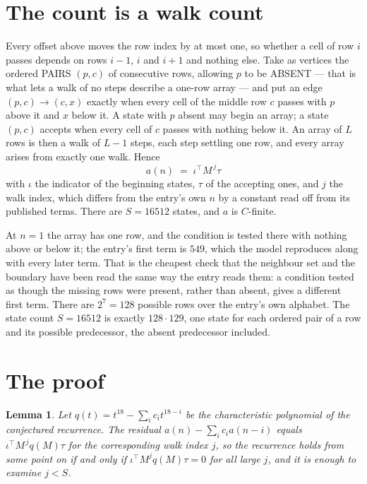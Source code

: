 \documentclass[11pt,a4paper]{article}
\theoremstyle{plain}
\newtheorem{lemma}[theorem]{Lemma}
\theoremstyle{definition}
\begin{document}
\section{The count is a walk count}

Every offset above moves the row index by at most one, so whether a cell of row $i$ passes
depends on rows $i-1$, $i$ and $i+1$ and nothing else. Take as vertices the ordered PAIRS
$(p,c)$ of consecutive rows, allowing $p$ to be ABSENT --- that is what lets a walk of no steps
describe a one-row array --- and put an edge $(p,c)\to(c,x)$ exactly when every cell of the
middle row $c$ passes with $p$ above it and $x$ below it. A state with $p$ absent may begin an
array; a state $(p,c)$ accepts when every cell of $c$ passes with nothing below it. An array of
$L$ rows is then a walk of $L-1$ steps, each step settling one row, and every array arises from
exactly one walk. Hence
\[
a(n)\;=\;\iota^{\!\top}M^{\,j}\tau
\]
with $\iota$ the indicator of the beginning states, $\tau$ of the accepting ones, and $j$ the
walk index, which differs from the entry's own $n$ by a constant read off from its published
terms. There are $S=16512$ states, and $a$ is $C$-finite.

At $n=1$ the array has one row, and
the condition is tested there with nothing above or below it; the entry's first term is
$549$, which the model reproduces along with every later term. That is the cheapest check
that the neighbour set and the boundary have been read the same way the entry reads them: a
condition tested as though the missing rows were present, rather than absent, gives a different
first term. There are $2^{7}=128$ possible rows over the entry's own alphabet. The state count $S=16512$ is exactly $128\cdot129$,
one state for each ordered pair of a row and its possible predecessor, the absent predecessor
included.

\section{The proof}

\begin{lemma}\label{lem:crit}
Let $q(t)=t^{18}-\sum_i c_it^{18-i}$ be the characteristic polynomial of the
conjectured recurrence. The residual $a(n)-\sum_ic_ia(n-i)$ equals
$\iota^{\!\top}M^{\,j}q(M)\tau$ for the corresponding walk index $j$, so the recurrence
holds from some point on if and only if $\iota^{\!\top}M^{j}q(M)\tau=0$ for all large $j$,
and it is enough to examine $j<S$.
\end{lemma}
\end{document}
